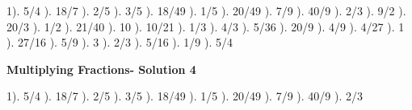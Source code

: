 \documentclass{article}%
\begin{document}
1). 5/4%
). 18/7%
). 2/5%
). 3/5%
). 18/49%
). 1/5%
). 20/49%
). 7/9%
). 40/9%
). 2/3%
). 9/2%
). 20/3%
). 1/2%
). 21/40%
). 10%
). 10/21%
). 1/3%
). 4/3%
). 5/36%
). 20/9%
). 4/9%
). 4/27%
). 1%
). 27/16%
). 5/9%
). 3%
). 2/3%
). 5/16%
). 1/9%
). 5/4%
\newline%
\newpage%
\large%
\begin{center}%
\textbf{Multiplying Fractions- Solution 4}%
\newline%
\end{center} \normalsize%
1). 5/4%
). 18/7%
). 2/5%
). 3/5%
). 18/49%
). 1/5%
). 20/49%
). 7/9%
). 40/9%
). 2/3%
\newline%
\end{document}
